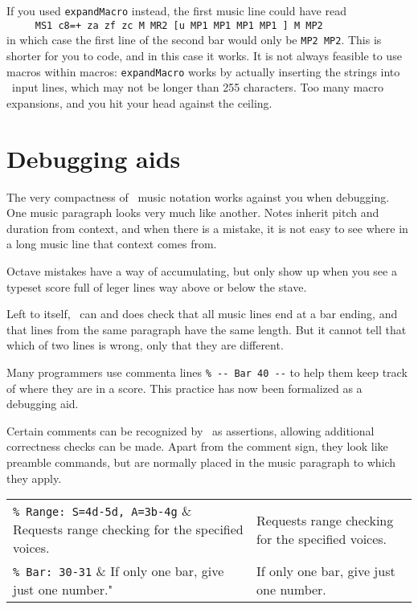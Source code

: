 \documentclass[11pt]{article}
\begin{document}
\hskip -18mm
\begin{mus}

\end{mus}
\vskip 12pt


If you used \texttt{expandMacro} instead, the first music line
could have read \\
\verb"     MS1 c8=+ za zf zc M MR2 [u MP1 MP1 MP1 MP1 ] M MP2" \\
in which case the first line of the second bar would only be \verb"MP2 MP2".
This is shorter for you to code, and in this case it works.
It is not always feasible to use macros within macros: 
\texttt{expandMacro} works
by actually inserting the strings into \MTx\ input lines, which
may not be longer than 255 characters.  Too many macro expansions,
and you hit your head against the ceiling.

\section{Debugging aids} 

The very compactness of \PMX\ music notation works against you
when debugging. One music paragraph looks very much like another.
Notes inherit pitch and duration from context, and when there is 
a mistake, it is not easy to see where in a long music line that 
context comes from. 

Octave mistakes have a way of accumulating, but only show up when 
you see a typeset score full of leger lines way above or below the 
stave.

Left to itself, \MTx\ can and does check that all music lines end 
at a bar ending, and that lines from the same paragraph have the 
same length. But it cannot tell that which of two lines is wrong, 
only that they are different.

Many programmers use commenta lines \verb`% -- Bar 40 --` to help 
them keep track of where they are in a score. This practice has
now been formalized as a debugging aid.

Certain comments can be recognized by \MTx\ as assertions, allowing
additional correctness checks can be made. Apart from the comment
sign, they look like preamble commands, but are normally placed in
the music paragraph to which they apply.

\begin{tabular}{ll}

\verb"% Range: S=4d-5d, A=3b-4g" & Requests range checking for the specified voices. \\
\verb"% Bar: 30-31" & If only one bar, give just one number.

\end{tabular}
\end{document}
